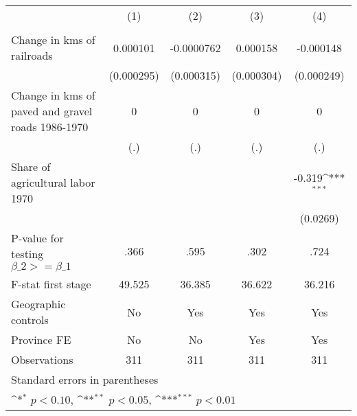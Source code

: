 {
\def\sym#1{\ifmmode^{#1}\else\(^{#1}\)\fi}
\begin{tabular}{l*{4}{c}}
\hline\hline
                &\multicolumn{1}{c}{(1)}&\multicolumn{1}{c}{(2)}&\multicolumn{1}{c}{(3)}&\multicolumn{1}{c}{(4)}\\
                &\multicolumn{1}{c}{}&\multicolumn{1}{c}{}&\multicolumn{1}{c}{}&\multicolumn{1}{c}{}\\
\hline
Change in kms of railroads& 0.000101         &-0.0000762         & 0.000158         &-0.000148         \\
                &(0.000295)         &(0.000315)         &(0.000304)         &(0.000249)         \\
[1em]
Change in kms of paved and gravel roads 1986-1970&        0         &        0         &        0         &        0         \\
                &      (.)         &      (.)         &      (.)         &      (.)         \\
[1em]
Share of agricultural labor 1970&                  &                  &                  &   -0.319\sym{***}\\
                &                  &                  &                  & (0.0269)         \\
\hline
P-value for testing $\beta\_{2} >= \beta\_{1}$&     .366         &     .595         &     .302         &     .724         \\
F-stat first stage&   49.525         &   36.385         &   36.622         &   36.216         \\
Geographic controls&       No         &      Yes         &      Yes         &      Yes         \\
Province FE     &       No         &       No         &      Yes         &      Yes         \\
Observations    &      311         &      311         &      311         &      311         \\
\hline\hline
\multicolumn{5}{l}{\footnotesize Standard errors in parentheses}\\
\multicolumn{5}{l}{\footnotesize \sym{*} \(p<0.10\), \sym{**} \(p<0.05\), \sym{***} \(p<0.01\)}\\
\end{tabular}
}
